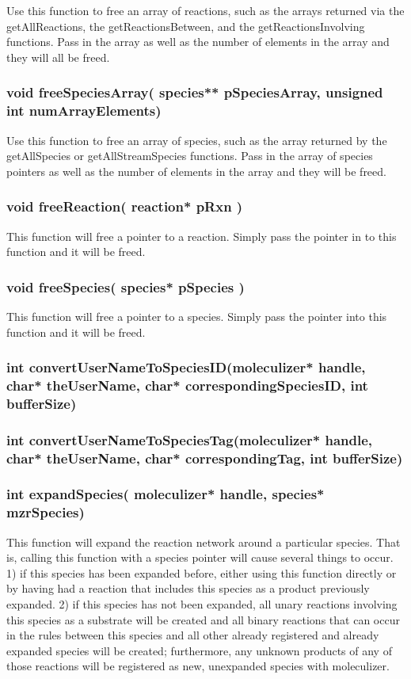 Use this function to free an array of reactions, such as the arrays
returned via the getAllReactions, the getReactionsBetween, and the
getReactionsInvolving functions.  Pass in the array as well as the
number of elements in the array and they will all be freed.

\subsubsection{void freeSpeciesArray( species** pSpeciesArray,
  unsigned int numArrayElements)}

Use this function to free an array of species, such as the array
returned by the getAllSpecies or getAllStreamSpecies functions.  Pass
in the array of species pointers as well as the number of elements in
the array and they will be freed.


\subsubsection{void freeReaction( reaction* pRxn )}
This function will free a pointer to a reaction.  Simply pass the
pointer in to this function and it will be freed.

\subsubsection{void freeSpecies( species* pSpecies )}
This function will free a pointer to a species.  Simply pass the
pointer into this function and it will be freed.

\subsubsection{int convertUserNameToSpeciesID(moleculizer* handle,
  char* theUserName, char* correspondingSpeciesID, int bufferSize)}


\subsubsection{int convertUserNameToSpeciesTag(moleculizer* handle,
  char* theUserName, char* correspondingTag, int bufferSize)}


\subsubsection{int expandSpecies( moleculizer* handle, species*
  mzrSpecies)}
This function will expand the reaction network around a particular
species.  That is, calling this function with a species pointer will
cause several things to occur.  1) if this species has been expanded
before, either using this function directly or by having had a
reaction that includes this species as a product previously expanded.
2) if this species has not been expanded, all unary reactions
involving this species as a substrate will be created and all binary
reactions that can occur in the rules between this species and all
other already registered and already expanded species will be created;
furthermore, any unknown products of any of those reactions will be
registered as new, unexpanded species with moleculizer.  

